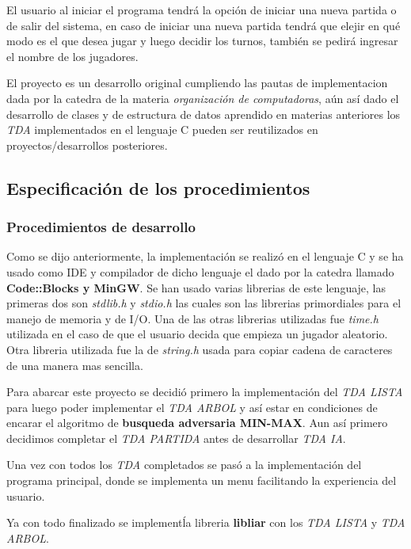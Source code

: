 \documentclass[12pt,twocolum,a4paper]{article}
\begin{document}
    El usuario al iniciar el programa tendr\'a la opci\'on de iniciar una nueva partida o de salir del sistema, en caso de iniciar una nueva partida tendr\'a que elejir en qu\'e modo es el que desea jugar y luego decidir los turnos, tambi\'en se pedir\'a ingresar el nombre de los jugadores.

    El proyecto es un desarrollo original cumpliendo las pautas de implementacion dada por la catedra de la materia {\itshape organizaci\'on de computadoras}, a\'un as\'i dado el desarrollo de clases y de estructura de datos aprendido en materias anteriores los {\itshape TDA} implementados en el lenguaje C pueden ser reutilizados en proyectos/desarrollos posteriores.

\subsection{Especificaci\'on de los procedimientos}

\subsubsection{Procedimientos de desarrollo}
    Como se dijo anteriormente, la implementaci\'on se realiz\'o en el lenguaje C y se ha usado como IDE y compilador de dicho lenguaje el dado por la catedra llamado {\bf Code::Blocks y MinGW}. Se han usado varias librerias de este lenguaje, las primeras dos son {\itshape stdlib.h} y {\itshape stdio.h} las cuales son las librerias primordiales para el manejo de memoria y de I/O. Una de las otras librerias utilizadas fue {\itshape time.h} utilizada en el caso de que el usuario decida que empieza un jugador aleatorio. Otra libreria utilizada fue la de {\itshape string.h} usada para copiar cadena de caracteres de una manera mas sencilla.

    Para abarcar este proyecto se decidi\'o primero la implementaci\'on del {\itshape TDA LISTA} para luego poder implementar el {\itshape TDA ARBOL} y as\'i estar en condiciones de encarar el algoritmo de {\bf busqueda adversaria MIN-MAX}. Aun as\'i primero decidimos completar el {\itshape TDA PARTIDA} antes de desarrollar {\itshape TDA IA}.

    Una vez con todos los {\itshape TDA} completados se pas\'o a la implementaci\'on del programa principal, donde se implementa un menu facilitando la experiencia del usuario.

    Ya con todo finalizado se implement\' la libreria {\bf libliar} con los {\itshape TDA LISTA} y {\itshape TDA ARBOL}.
\end{document}
